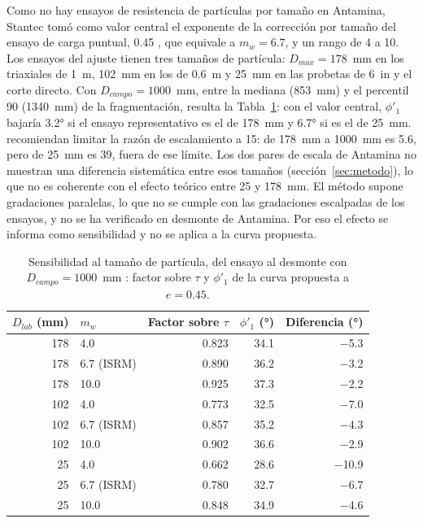 \documentclass[11pt,letterpaper]{article}
\begin{document}
Como no hay ensayos de resistencia de partículas por tamaño en Antamina, Stantec tomó como valor central el exponente de la corrección por tamaño del ensayo de carga puntual, 0.45 \citep{isrm1985}, que equivale a $m_w = 6.7$, y un rango de 4 a 10. Los ensayos del ajuste tienen tres tamaños de partícula: $D_{max} = 178$~mm en los triaxiales de 1~m, 102~mm en los de 0.6~m y 25~mm en las probetas de 6~in y el corte directo. Con $D_{campo} = 1000$~mm, entre la mediana (853~mm) y el percentil 90 (1340~mm) de la fragmentación, resulta la Tabla~\ref{tab:tamano}: con el valor central, $\phi'_1$ bajaría 3.2° si el ensayo representativo es el de 178~mm y 6.7° si es el de 25~mm. \citet{frossard2012} recomiendan limitar la razón de escalamiento a 15: de 178~mm a 1000~mm es 5.6, pero de 25~mm es 39, fuera de ese límite. Los dos pares de escala de Antamina no muestran una diferencia sistemática entre esos tamaños (sección~\ref{sec:metodo}), lo que no es coherente con el efecto teórico entre 25 y 178~mm. El método supone gradaciones paralelas, lo que no se cumple con las gradaciones escalpadas de los ensayos, y no se ha verificado en desmonte de Antamina. Por eso el efecto se informa como sensibilidad y no se aplica a la curva propuesta.

\begin{table}[!htbp]\centering\small\caption{Sensibilidad al tamaño de partícula, del ensayo al desmonte con $D_{campo} = 1000$~mm \citep{frossard2012}: factor sobre $\tau$ y $\phi'_1$ de la curva propuesta a $e = 0.45$.}\label{tab:tamano}
\begin{tabular}{rlrrr}\toprule $D_{lab}$ (mm) & $m_w$ & Factor sobre $\tau$ & $\phi'_1$ (°) & Diferencia (°)\\\midrule
178 & 4.0 & 0.823 & 34.1 & $-$5.3 \\
178 & 6.7 (ISRM) & 0.890 & 36.2 & $-$3.2 \\
178 & 10.0 & 0.925 & 37.3 & $-$2.2 \\
102 & 4.0 & 0.773 & 32.5 & $-$7.0 \\
102 & 6.7 (ISRM) & 0.857 & 35.2 & $-$4.3 \\
102 & 10.0 & 0.902 & 36.6 & $-$2.9 \\
25 & 4.0 & 0.662 & 28.6 & $-$10.9 \\
25 & 6.7 (ISRM) & 0.780 & 32.7 & $-$6.7 \\
25 & 10.0 & 0.848 & 34.9 & $-$4.6 \\
\bottomrule\end{tabular}\end{table}
\end{document}
